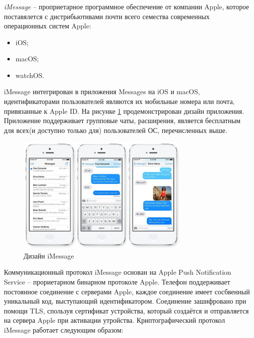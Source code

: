 \subsubsection{}
\label{sec:analysis:research:analogs:imessage}

\textit{iMessage} -- проприетарное программное обеспечение от компании Apple, которое поставялется с дистрибьютивами почти всего семества современных операционных систем Apple:
\begin{itemize}
	\item iOS;
	\item macOS;
	\item watchOS.
\end{itemize}

iMessage интегрирован в приложения Messages на iOS и macOS, идентификаторами пользователей являются их мобильные номера или почта, привязанные к Apple ID. На рисунке \ref{sec:analysis:research:analogs:imessage:design} продемонстрирован дизайн приложения. Приложение поддерживает групповые чаты, расширения, является бесплатным для всех(и доступно только для) пользователей ОС, перечисленных выше.

\begin{figure}[h]
  \centering
    \includegraphics[width=0.75\textwidth]{inc/img/imdesign.jpeg}
  \caption{Дизайн iMessage}
  \label{sec:analysis:research:analogs:imessage:design}
\end{figure}

Коммуникационный протокол iMessage основан на Apple Push Notification Service -- прориетарном бинарном протоколе Apple. Телефон поддерживает постоянное соединение с серверами Apple, каждое соединение имеет сосбвенный уникальный код, выступающий идентификатором. Соединение зашифровано при помощи TLS, спользуя сертификат устройства, который создаётся и отправляется на сервера Apple при активации утройства.
Криптографический протокол iMessage работает следующим образом:

